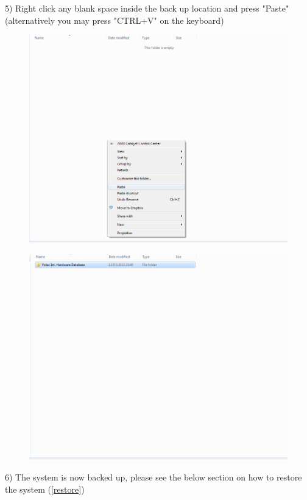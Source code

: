 5) Right click any blank space inside the back up location and press "Paste" (alternatively you may press "CTRL+V" on the keyboard)

\begin{figure}[H]
    \includegraphics[width=\textwidth]{./Manual/Images/backup4.png}
\end{figure}

\begin{figure}[H]
    \includegraphics[width=\textwidth]{./Manual/Images/backup5.png}
\end{figure}

6) The system is now backed up, please see the below section on how to restore the system (\ref{restore})

